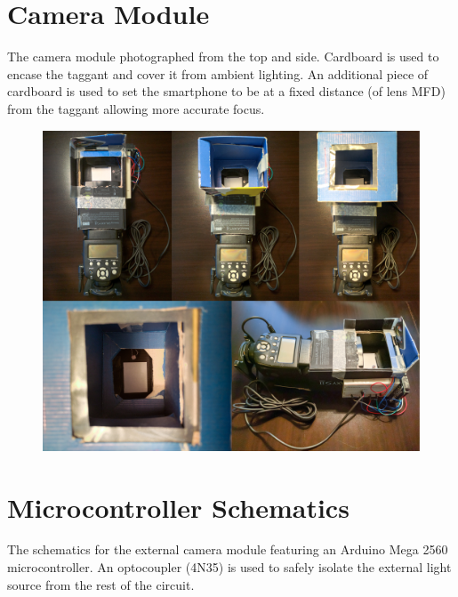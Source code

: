 \documentclass[thesis.tex]{subfiles}
\begin{document}
\chapter{Camera Module}
\label{appendix:camera-module}

The camera module photographed from the top and side. Cardboard is used to encase the taggant and cover it from ambient lighting. An additional piece of cardboard is used to set the smartphone to be at a fixed distance (of lens MFD) from the taggant allowing more accurate focus.

\begin{figure}[h]
\centering \includegraphics[width=\textwidth,height=\textheight,keepaspectratio=true]{images/design_implementation/camera_module-actual.jpg}
\end{figure}




\chapter{Microcontroller Schematics}
\label{appendix:camera-module-schematics}

The schematics for the external camera module featuring an Arduino Mega 2560 microcontroller. An optocoupler (4N35) is used to safely isolate the external light source from the rest of the circuit.
\end{document}
